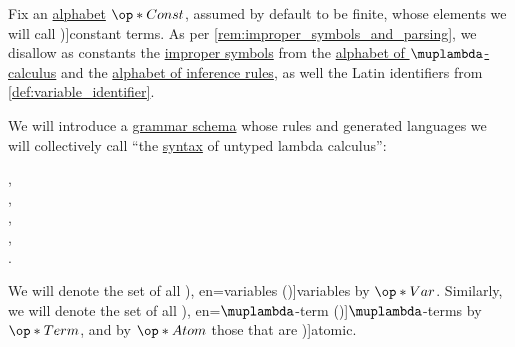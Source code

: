 \begin{definition}\label{def:lambda_term}\mimprovised
  Fix an \hyperref[def:formal_language/alphabet]{alphabet} \( \op*{Const} \), assumed by default to be finite, whose elements we will call \term[en=constant (\cite[202]{Andrews2002Logic})]{constant terms}. As per \cref{rem:improper_symbols_and_parsing}, we disallow as constants the \hyperref[con:improper_symbol]{improper symbols} from the \hyperref[def:lambda_term_alphabet]{alphabet of \( \muplambda \)-calculus} and the \hyperref[def:inference_rule_alphabet]{alphabet of inference rules}, as well the Latin identifiers from \cref{def:variable_identifier}.

  We will introduce a \hyperref[def:formal_grammar/schema]{grammar schema} whose rules and generated languages we will collectively call \enquote{the \hyperref[con:syntax_semantics_duality]{syntax} of untyped lambda calculus}:
  \begin{bnf*}
        {}, \\
            { \bnfor {}}, \\
     {\bnftsq{\( ( \)} \bnfsp {} \bnfsp {} \bnfsp \bnftsq{\( ) \)}}, \\
     {\bnftsq{\( ( \)} \bnfsp \bnftsq{\( \synlambda \)} \bnfsp {} \bnfsp {} \bnfsp {} \bnfsp \bnftsq{\( ) \)}}, \\
            { \bnfor {} \bnfor {}}.
  \end{bnf*}

  We will denote the set of all \term[ru=переменные (\cite[268]{Герасимов2014Вычислимость}), en=variables (\cite[\S 3.1.1]{Mimram2020ProgramEqualsProof})]{variables} by \( \op*{Var} \). Similarly, we will denote the set of all \term[ru=\( \muplambda \)-терм (\cite[268]{Герасимов2014Вычислимость}), en=\( \muplambda \)-term (\cite[def. 1A1]{Hindley1997BasicSTT})]{\( \muplambda \)-terms} by \( \op*{Term} \), and by \( \op*{Atom} \) those that are \term[en=atomic (terms) (\cite[def. 1A1(i)]{Hindley1997BasicSTT})]{atomic}.
\end{definition}
